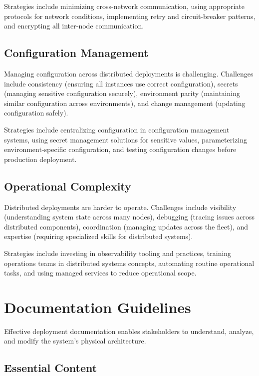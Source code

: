 \documentclass[11pt]{article}
\begin{document}
Strategies include minimizing cross-network communication, using appropriate protocols for network conditions, implementing retry and circuit-breaker patterns, and encrypting all inter-node communication.

\subsection{Configuration Management}

Managing configuration across distributed deployments is challenging. Challenges include consistency (ensuring all instances use correct configuration), secrets (managing sensitive configuration securely), environment parity (maintaining similar configuration across environments), and change management (updating configuration safely).

Strategies include centralizing configuration in configuration management systems, using secret management solutions for sensitive values, parameterizing environment-specific configuration, and testing configuration changes before production deployment.

\subsection{Operational Complexity}

Distributed deployments are harder to operate. Challenges include visibility (understanding system state across many nodes), debugging (tracing issues across distributed components), coordination (managing updates across the fleet), and expertise (requiring specialized skills for distributed systems).

Strategies include investing in observability tooling and practices, training operations teams in distributed systems concepts, automating routine operational tasks, and using managed services to reduce operational scope.

\section{Documentation Guidelines}

Effective deployment documentation enables stakeholders to understand, analyze, and modify the system's physical architecture.

\subsection{Essential Content}
\end{document}
